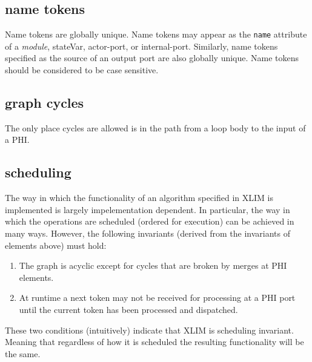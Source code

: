 \subsection{name tokens}
Name tokens are globally unique.  Name tokens may appear as the {\tt name} attribute of
a {\it module}, stateVar, actor-port, or internal-port.  Similarly, name tokens specified
as the source of an output port are also globally unique.  Name tokens should be considered
to be case sensitive.

\subsection{graph cycles}
The only place cycles are allowed is in the path from a loop body to the input of a PHI.

\subsection{scheduling}
The way in which the functionality of an algorithm specified in XLIM is implemented is largely impelementation dependent.  In particular, the way in which the operations are scheduled (ordered for execution) can be achieved in many ways.  However, the following invariants (derived from the invariants of elements above) must hold:\\
\begin{enumerate}
\item The graph is acyclic except for cycles that are broken by merges at PHI elements.
\item At runtime a next token may not be received for processing at a PHI port until the current token has been processed and dispatched.
\end{enumerate}
These two conditions (intuitively) indicate that XLIM is scheduling invariant.  Meaning that
regardless of how it is scheduled the resulting functionality will be the same.

